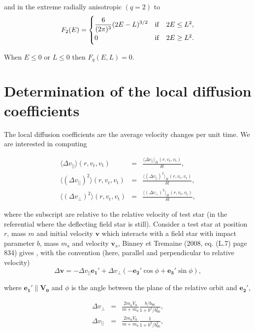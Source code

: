 \documentclass[11pt]{article}
\newcommand{\rt}{\mathrm{t}}
\newcommand{\rr}{\mathrm{r}}
\newcommand{\vr}{v_{\rr}}
\newcommand{\vt}{v_{\rt}}
\newcommand{\bv}{\boldsymbol{v}}
\newcommand{\Fq}{F_{q}}
\newcommand{\ra}{\mathrm{a}}
\newcommand{\va}{v_{\ra}}
\newcommand{\dvPar}{\Delta v_{||}}
\newcommand{\dvPerp}{\Delta v_{\perp}}
\newcommand{\dvParAvr}{\langle \dvPar \rangle_{\delta t}}
\newcommand{\dvParSqAvr}{\langle(\dvPar)^{2}\rangle_{\delta t}}
\newcommand{\dvPerpSqAvr}{\langle(\dvPerp)^{2}\rangle_{\delta t}}
\newcommand{\dvParAvrLoc}{\langle \dvPar \rangle}
\newcommand{\dvParSqAvrLoc}{\langle(\dvPar)^{2}\rangle}
\newcommand{\dvPerpSqAvrLoc}{\langle(\dvPerp)^{2}\rangle}
\newcommand{\bva}{\boldsymbol{\va}}
\newcommand{\ma}{m_{\ra}}
\newcommand{\e}[1]{\boldsymbol{e_{#1}}}
\newcommand{\bV}[1]{\boldsymbol{V_{#1}}}
\begin{document}
and in the extreme radially anisotropic $(q=2)$ to
\begin{equation}
  F_{2}(E)=\begin{cases}
\displaystyle{ \frac{6}{(2\pi)^{3}}(2E-L)^{3/2}} & {\rm{if}} \quad 2 E\leq L^{2} ,\\
0 &{\rm{if}} \quad  2 E\geq L^{2} .
\end{cases}
  \label{eq:F_q=2}
\end{equation}

When $E \leq 0$ or $L \leq 0$ then $\Fq(E,L) = 0$.




\section{Determination of the local diffusion coefficients}
\label{sec:LocDiffCoeffs}

The local diffusion coefficients are the average velocity changes
per unit time. We are interested in computing

\begin{equation}
\begin{array}{ccl}
  \dvParAvrLoc(r,\vr,\vt) & = & \displaystyle{\frac{ \dvParAvr(r,\vr,\vt)}{\delta t}} ,\\
 \dvParSqAvrLoc(r,\vr,\vt) & = & \displaystyle{\frac{ \dvParSqAvr(r,\vr,\vt)}{\delta t}}  ,\\
\dvPerpSqAvrLoc(r,\vr,\vt) & = & \displaystyle{\frac{ \dvPerpSqAvr(r,\vr,\vt)}{\delta t}} ,
\end{array}
\label{eq:DiffCoeffLoc}
\end{equation}

where the subscript are relative to the relative velocity of test star (in the referential where the deflecting field star is still). Consider a test star at position $r$, mass $m$ and initial velocity
$\bv$ which interacts with a field star with impact parameter
$b$, mass $\ma$ and velocity  $\bva$, Binney et Tremaine
(2008, eq. (L.7) page 834) gives , with the convention (here, parallel
and perpendicular to relative velocity)
\begin{equation}
  \Delta\boldsymbol{v}=- \dvPar \e1'+\dvPerp(-\e2'\cos\phi+\e3'\sin\phi) ,
  \label{eq:deltaV}
\end{equation}

where $\e1' \parallel \bV0$ and $\phi$
is the angle between the plane of the relative orbit and $\e2'$,

\begin{equation}
\begin{array}{ccl}
  \dvPerp & =&\displaystyle{\frac{2m_{a}V_{0}}{m+m_{a}}\frac{b/b_{90}}{1+b^{2}/b_{90}^{2}}} ,\\
 \dvPar & = & \displaystyle{\frac{2m_{a}V_{0}}{m+m_{a}}\frac{1}{1+b^{2}/b_{90}^{2}}} ,
\end{array}
\label{eq:delta_v}
\end{equation}
\end{document}
